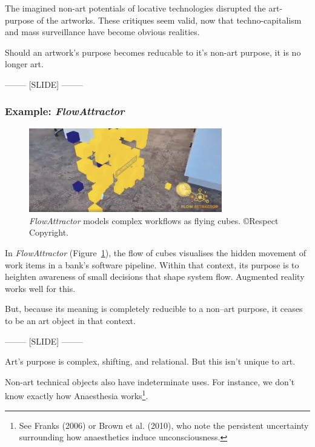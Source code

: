 \documentclass[letter:wpaper]{article}
\begin{document}
    The imagined non-art potentials of locative technologies disrupted the art-purpose of the artworks. These critiques seem valid, now that techno-capitalism and mass surveillance have become obvious realities.

    Should an artwork’s purpose becomes reducable to it's non-art purpose, it is no longer art.

    -------- [SLIDE] --------

    \subsubsection{Example: \emph{FlowAttractor}}

    \begin{figure}[h]
        \includegraphics[width=3.31in]{flow-attractor.png}
        \caption{\emph{FlowAttractor} models complex workflows as flying cubes. \copyright Respect Copyright.}
        \label{fig:flow-attractor}
    \end{figure}

    In \emph{FlowAttractor} (Figure~\ref{fig:flow-attractor}), the flow of cubes visualises the hidden movement of work items in a bank’s software pipeline. Within that context, its purpose is to heighten awareness of small decisions that shape system flow. Augmented reality works well for this.

    But, because its meaning is completely reducible to a non–art purpose, it ceases to be an art object in that context.

    -------- [SLIDE] --------

    Art’s purpose is complex, shifting, and relational. But this isn’t unique to art.

    Non-art technical objects also have indeterminate uses. For instance, we don't know exactly how Anaesthesia works\footnote{
        See Franks (2006) or Brown et al. (2010), who note the persistent uncertainty surrounding how anaesthetics induce unconsciousness.
    }.
\end{document}
